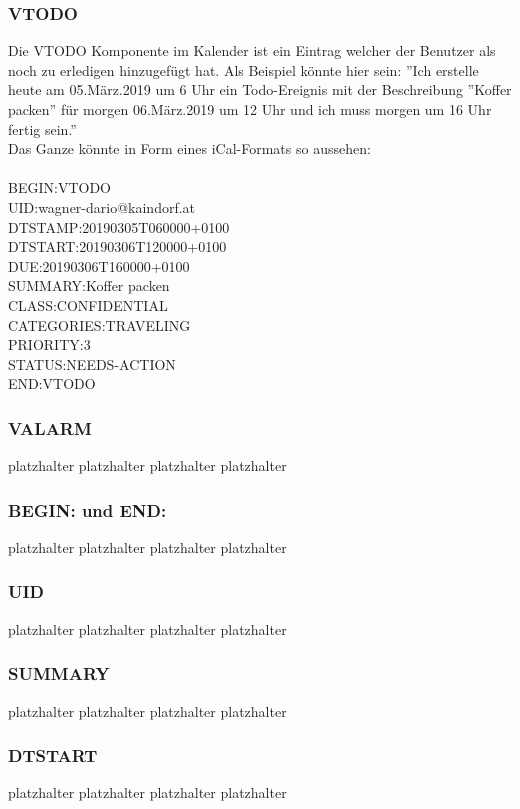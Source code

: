 \subsubsection{VTODO}
\label{sec:vTodo} 
Die VTODO Komponente im Kalender ist ein Eintrag welcher der Benutzer als noch zu erledigen hinzugefügt hat. Als Beispiel könnte hier sein: ''Ich erstelle heute am 05.März.2019 um 6 Uhr ein Todo-Ereignis mit der Beschreibung ''Koffer packen'' für morgen 06.März.2019 um 12 Uhr und ich muss morgen um 16 Uhr fertig sein.'' \\
Das Ganze könnte in Form eines iCal-Formats so aussehen: \\ \\
  BEGIN:VTODO \\
  UID:wagner-dario@kaindorf.at\\
  DTSTAMP:20190305T060000+0100\\
  DTSTART:20190306T120000+0100\\
  DUE:20190306T160000+0100\\
  SUMMARY:Koffer packen\\
  CLASS:CONFIDENTIAL\\
  CATEGORIES:TRAVELING\\
  PRIORITY:3\\
  STATUS:NEEDS-ACTION\\
  END:VTODO\\
  
\subsubsection{VALARM}
\label{sec:vAlarm} 
platzhalter platzhalter platzhalter platzhalter 
\subsubsection{BEGIN: und END:}
\label{sec:beginUndEnd} 
platzhalter platzhalter platzhalter platzhalter 
\subsubsection{UID}
\label{sec:uid}
platzhalter platzhalter platzhalter platzhalter 
\subsubsection{SUMMARY}
\label{sec:summary}
platzhalter platzhalter platzhalter platzhalter 
\subsubsection{DTSTART}
\label{sec:dtstart}
platzhalter platzhalter platzhalter platzhalter 
